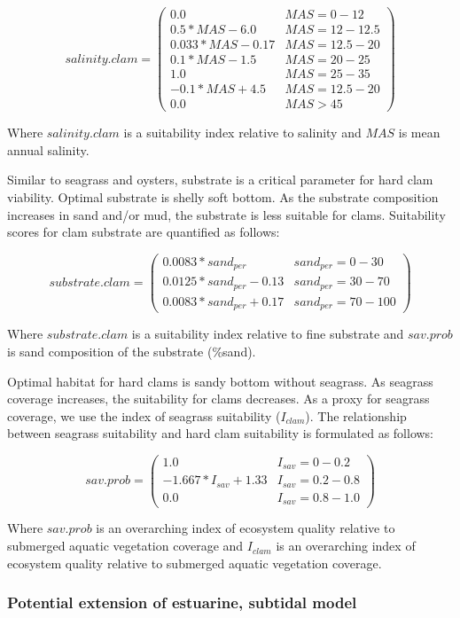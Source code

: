 \documentclass[
]{book}
\begin{document}
\[salinity.clam = \begin{pmatrix} 0.0 & MAS=0-12\\
0.5*MAS-6.0 & MAS=12-12.5\\
0.033*MAS-0.17 & MAS=12.5-20\\
0.1*MAS-1.5 & MAS=20-25\\
1.0 & MAS=25-35\\
-0.1*MAS+4.5 & MAS=12.5-20\\
0.0 & MAS>45
\end{pmatrix}\]

Where \(salinity.clam\) is a suitability index relative to salinity and \(MAS\) is mean annual salinity.

Similar to seagrass and oysters, substrate is a critical parameter for hard clam viability. Optimal substrate is shelly soft bottom. As the substrate composition increases in sand and/or mud, the substrate is less suitable for clams. Suitability scores for clam substrate are quantified as follows:

\[substrate.clam = \begin{pmatrix} 0.0083*sand_{per} & sand_{per}=0-30\\
0.0125*sand_{per}-0.13 & sand_{per}=30-70\\
0.0083*sand_{per}+0.17 & sand_{per}=70-100
\end{pmatrix}\]

Where \(substrate.clam\) is a suitability index relative to fine substrate and \(sav.prob\) is sand composition of the substrate (\%sand).

Optimal habitat for hard clams is sandy bottom without seagrass. As seagrass coverage increases, the suitability for clams decreases. As a proxy for seagrass coverage, we use the index of seagrass suitability (\(I_{clam}\)). The relationship between seagrass suitability and hard clam suitability is formulated as follows:

\[sav.prob = \begin{pmatrix} 1.0 & I_{sav}=0-0.2\\
-1.667*I_{sav}+1.33 & I_{sav}=0.2-0.8\\
0.0 & I_{sav}=0.8-1.0
\end{pmatrix}\]

Where \(sav.prob\) is an overarching index of ecosystem quality relative to submerged aquatic vegetation coverage and \(I_{clam}\) is an overarching index of ecosystem quality relative to submerged aquatic vegetation coverage.

\hypertarget{potential-extension-of-estuarine-subtidal-model}{%
\subsubsection{Potential extension of estuarine, subtidal model}\label{potential-extension-of-estuarine-subtidal-model}}
\end{document}
